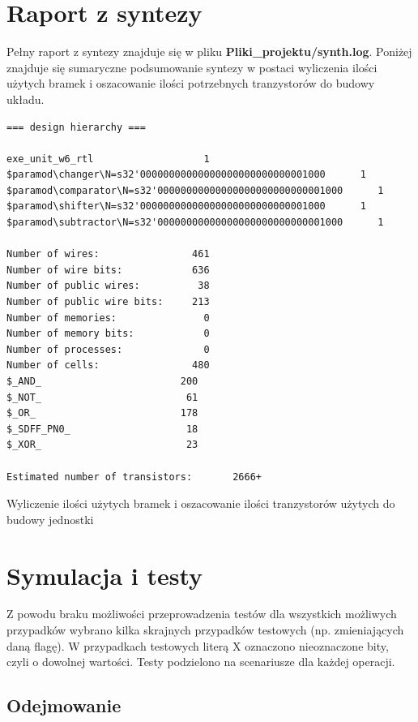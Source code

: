 \documentclass[12pt]{article}
\begin{document}
	\section*{Raport z syntezy}
	Pełny raport z syntezy znajduje się w pliku \textbf{Pliki\_projektu/synth.log}. Poniżej znajduje się sumaryczne podsumowanie syntezy w postaci wyliczenia ilości użytych bramek i oszacowanie ilości potrzebnych tranzystorów do budowy układu. 
	
	\begin{program}
		\begin{verbatim}
=== design hierarchy ===

exe_unit_w6_rtl                   1
$paramod\changer\N=s32'00000000000000000000000000001000      1
$paramod\comparator\N=s32'00000000000000000000000000001000      1
$paramod\shifter\N=s32'00000000000000000000000000001000      1
$paramod\subtractor\N=s32'00000000000000000000000000001000      1

Number of wires:                461
Number of wire bits:            636
Number of public wires:          38
Number of public wire bits:     213
Number of memories:               0
Number of memory bits:            0
Number of processes:              0
Number of cells:                480
$_AND_                        200
$_NOT_                         61
$_OR_                         178
$_SDFF_PN0_                    18
$_XOR_                         23

Estimated number of transistors:       2666+
		\end{verbatim}
		\caption*{Wyliczenie ilości użytych bramek i oszacowanie ilości tranzystorów użytych do budowy jednostki}
		\label{code:output}
	\end{program}
\vspace{-20pt}
	
	\section*{Symulacja i testy}
	
	Z powodu braku możliwości przeprowadzenia testów dla wszystkich możliwych przypadków wybrano kilka skrajnych przypadków testowych (np. zmieniających daną flagę). W przypadkach testowych literą X oznaczono nieoznaczone bity, czyli o dowolnej wartości.  Testy podzielono na scenariusze dla każdej operacji. 
	
	\subsection*{Odejmowanie}
	
\end{document}
